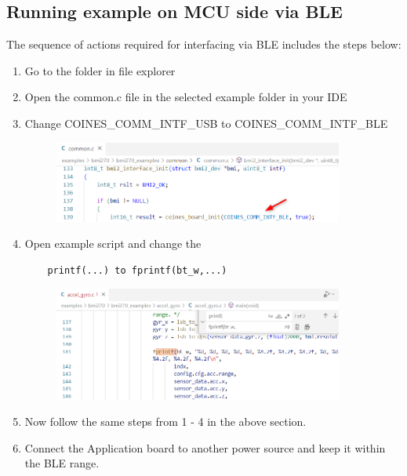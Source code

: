 \documentclass{article}
\begin{document}
\subsection{Running example on MCU side via BLE}
The sequence of actions required for interfacing via BLE includes the steps below:
\begin{enumerate}
	\item Go to the  folder in file explorer
	\item Open the common.c file in the selected example folder in your IDE
	\item Change COINES\_COMM\_INTF\_USB  to COINES\_COMM\_INTF\_BLE
	\begin{figure}[H]
		\begin{center}
			\includegraphics[width=0.9\textwidth]{coinesAPI_images/Mcu_example_ble_intf.png}
		\end{center}
	\end{figure}
	\item Open example script and change the 
	\begin{verbatim}
	printf(...) to fprintf(bt_w,...)
	\end{verbatim}
	\begin{figure}[H]
		\begin{center}
			\includegraphics[width=0.9\textwidth]{coinesAPI_images/Mcu_example_ble_print.png}
		\end{center}
	\end{figure}
	\item Now follow the same steps from 1 - 4 in the above section.
	\item Connect the Application board to another power source and keep it within the BLE range.

\end{enumerate}
\end{document}
